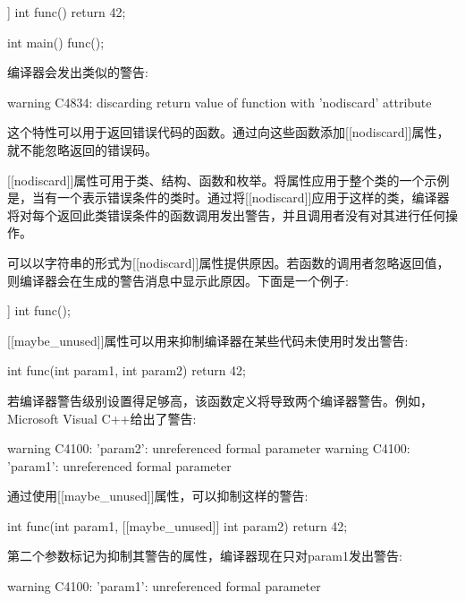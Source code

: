 \begin{cpp}
[[nodiscard]] int func() { return 42; }

int main()
{
    func();
}
\end{cpp}

编译器会发出类似的警告:

\begin{shell}
warning C4834: discarding return value of function with 'nodiscard' attribute
\end{shell}

这个特性可以用于返回错误代码的函数。通过向这些函数添加[[nodiscard]]属性，就不能忽略返回的错误码。

[[nodiscard]]属性可用于类、结构、函数和枚举。将属性应用于整个类的一个示例是，当有一个表示错误条件的类时。通过将[[nodiscard]]应用于这样的类，编译器将对每个返回此类错误条件的函数调用发出警告，并且调用者没有对其进行任何操作。

可以以字符串的形式为[[nodiscard]]属性提供原因。若函数的调用者忽略返回值，则编译器会在生成的警告消息中显示此原因。下面是一个例子:

\begin{cpp}
[[nodiscard("Some explanation")]] int func();
\end{cpp}


[[maybe\_unused]]属性可以用来抑制编译器在某些代码未使用时发出警告:

\begin{cpp}
int func(int param1, int param2)
{
    return 42;
}
\end{cpp}

若编译器警告级别设置得足够高，该函数定义将导致两个编译器警告。例如，Microsoft Visual C++给出了警告:

\begin{shell}
warning C4100: 'param2': unreferenced formal parameter
warning C4100: 'param1': unreferenced formal parameter
\end{shell}

通过使用[[maybe\_unused]]属性，可以抑制这样的警告:

\begin{cpp}
int func(int param1, [[maybe_unused]] int param2)
{
    return 42;
}
\end{cpp}

第二个参数标记为抑制其警告的属性，编译器现在只对param1发出警告:

\begin{shell}
warning C4100: 'param1': unreferenced formal parameter
\end{shell}

